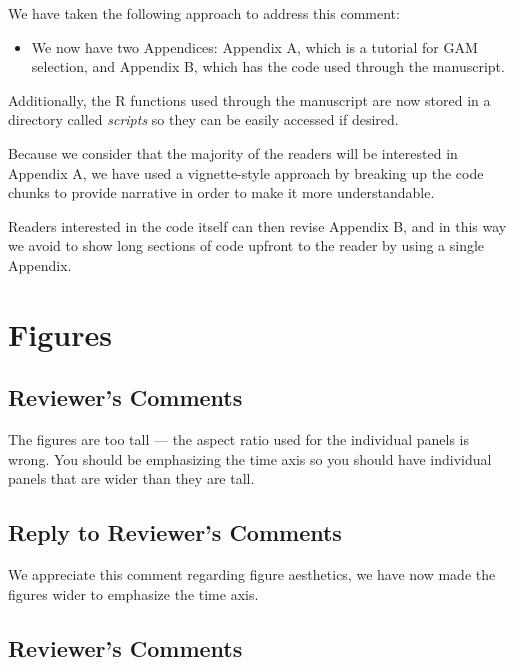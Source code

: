 \documentclass[
]{article}
\providecommand{\tightlist}{%
  \setlength{\itemsep}{0pt}\setlength{\parskip}{0pt}}
\begin{document}
We have taken the following approach to address this comment:

\begin{itemize}
\tightlist
\item
  We now have two Appendices: Appendix A, which is a tutorial for GAM selection, and Appendix B, which has the code used through the manuscript.
\end{itemize}

Additionally, the R functions used through the manuscript are now stored in a directory called \emph{scripts} so they can be easily accessed if desired.

Because we consider that the majority of the readers will be interested in Appendix A, we have used a vignette-style approach by breaking up the code chunks to provide narrative in order to make it more understandable.

Readers interested in the code itself can then revise Appendix B, and in this way we avoid to show long sections of code upfront to the reader by using a single Appendix.

\hypertarget{figures}{%
\section{Figures}\label{figures}}

\hypertarget{reviewers-comments-14}{%
\subsection{Reviewer's Comments}\label{reviewers-comments-14}}

The figures are too tall --- the aspect ratio used for the individual panels is wrong. You should be emphasizing the time axis so you should have individual panels that are wider than they are tall.

\hypertarget{section-15}{%
\subsection{\texorpdfstring{\textcolor{reviewersblue} {Reply to Reviewer's Comments}}{}}\label{section-15}}

We appreciate this comment regarding figure aesthetics, we have now made the figures wider to emphasize the time axis.

\hypertarget{reviewers-comments-15}{%
\subsection{Reviewer's Comments}\label{reviewers-comments-15}}
\end{document}
